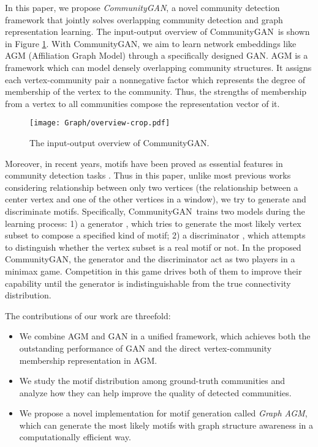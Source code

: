 \documentclass[sigconf]{acmart}
\newcommand{\ComGAN}{CommunityGAN}
\begin{document}
In this paper, we propose \textit{\ComGAN}, a novel community detection framework that jointly solves overlapping community detection and graph representation learning.
The input-output overview of \ComGAN~is shown in Figure \ref{fig:overview}.
With \ComGAN, we aim to learn network embeddings like AGM (Affiliation Graph Model) through a specifically designed GAN.
AGM \cite{yang2012community,yang2013overlapping} is a framework which can model densely overlapping community structures.
It assigns each vertex-community pair a nonnegative factor which represents the degree of membership of the vertex to the community.
Thus, the strengths of membership from a vertex to all communities compose the representation vector of it.

\begin{figure}[]
\texttt{[image: Graph/overview-crop.pdf]}
\caption{The input-output overview of \ComGAN.}
\label{fig:overview}
\end{figure}

Moreover, in recent years, motifs have been proved as essential features in community detection tasks \cite{triangle}.
Thus in this paper, unlike most previous works considering relationship between only two vertices (the relationship between a center vertex and one of the other vertices in a window), we try to generate and discriminate motifs.
Specifically, \ComGAN~trains two models during the learning process:
1) a generator , which tries to generate the most likely vertex subset  to compose a specified kind of motif;
2) a discriminator , which attempts to distinguish whether the vertex subset  is a real motif or not.
In the proposed \ComGAN, the generator  and the discriminator  act as two players in a minimax game.
Competition in this game drives both of them to improve their capability until the generator is indistinguishable from the true connectivity distribution.

The contributions of our work are threefold:

\begin{itemize}
    \item We combine AGM and GAN in a unified framework, which achieves both the outstanding performance of GAN and the direct vertex-community membership representation in AGM.
    \item We study the motif distribution among ground-truth communities and analyze how they can help improve the quality of detected communities.
    \item We propose a novel implementation for motif generation called \textit{Graph AGM}, which can generate the most likely motifs with graph structure awareness in a computationally efficient way.
\end{itemize}
\end{document}
